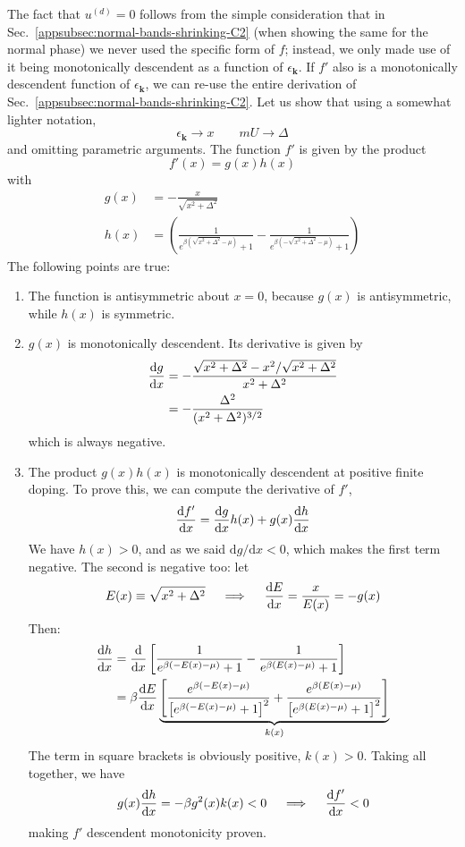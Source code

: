 The fact that $u^{(d)}=0$ follows from the simple consideration that in Sec.~\ref{appsubsec:normal-bands-shrinking-C2} (when showing the same for the normal phase) we never used the specific form of $f$; instead, we only made use of it being monotonically descendent as a function of $\epsilon_\mathbf{k}$. If $f'$ also is a monotonically descendent function of $\epsilon_\mathbf{k}$, we can re-use the entire derivation of Sec.~\ref{appsubsec:normal-bands-shrinking-C2}. Let us show that using a somewhat lighter notation,
\[
\epsilon_\mathbf{k} \to x
\qquad
mU \to \Delta
\]
and omitting parametric arguments. The function $f'$ is given by the product
\[
f'(x) = g(x) h(x)
\]
with
\[
\begin{aligned}
	g(x) &= -\frac{x}{\sqrt{x^2 + \Delta^2}} \\
	h(x) &= \left(
	\frac{1}{e^{\beta(\sqrt{x^2+\Delta^2}-\mu)}+1} - \frac{1}{e^{\beta(-\sqrt{x^2+\Delta^2}-\mu)}+1}
	\right)
\end{aligned}
\]
The following points are true:
\begin{enumerate}
	\item The function is antisymmetric about $x=0$, because $g(x)$ is antisymmetric, while $h(x)$ is symmetric.
	\item $g(x)$ is monotonically descendent. Its derivative is given by
	\[
	\begin{aligned}
		\dv{g}{x} &= - \frac{\sqrt{x^2 + \Delta^2} - x^2/\sqrt{x^2 + \Delta^2}}{x^2 + \Delta^2} \\
		&= -\frac{\Delta^2}{(x^2 + \Delta^2)^{3/2}}
	\end{aligned}
	\]
	which is always negative.
	\item The product $g(x)h(x)$ is monotonically descendent at positive finite doping. To prove this, we can compute the derivative of $f'$,
	\[
	\dv{f'}{x} = \dv{g}{x} h(x) + g(x) \dv{h}{x}
	\]
	We have $h(x)>0$, and as we said $\mathrm{d}g/\mathrm{d}x<0$, which makes the first term negative. The second is negative too: let
	\[
	E(x) \equiv \sqrt{x^2 + \Delta^2}
	\quad\implies\quad
	\dv{E}{x} = \frac{x}{E(x)} = -g(x)
	\]
	Then:
	\[
	\begin{aligned}
		\dv{h}{x} &= \dv{}{x} \left[
		\frac{1}{e^{\beta(-E(x)-\mu)}+1} - \frac{1}{e^{\beta(E(x)-\mu)}+1}
		\right] \\
		&= \beta \dv{E}{x} \underbrace{
			\left[
			\frac{e^{\beta(-E(x)-\mu)}}{\left[e^{\beta(-E(x)-\mu)}+1\right]^2} + \frac{e^{\beta(E(x)-\mu)}}{\left[e^{\beta(E(x)-\mu)}+1\right]^2}
			\right]	
		}_{k(x)}
	\end{aligned}
	\]
	The term in square brackets is obviously positive, $k(x)>0$. Taking all together, we have
	\[
	g(x) \dv{h}{x} = -\beta g^2(x) k(x) < 0
	\quad\implies\quad
	\dv{f'}{x} < 0
	\]
	making $f'$ descendent monotonicity proven.
\end{enumerate}
